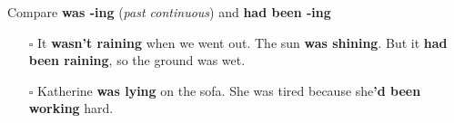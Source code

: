 Compare \textbf{was -ing} (\textit{past continuous}) and \textbf{had been -ing}
\begin{itemize}
    \item[$\square$] It \textbf{wasn't raining} when we went out. The sun \textbf{was shining}. But it \textbf{had been raining}, so the ground was wet.
    \item[$\square$] Katherine \textbf{was lying} on the sofa. She was tired because she\textbf{'d been working} hard.
\end{itemize}
